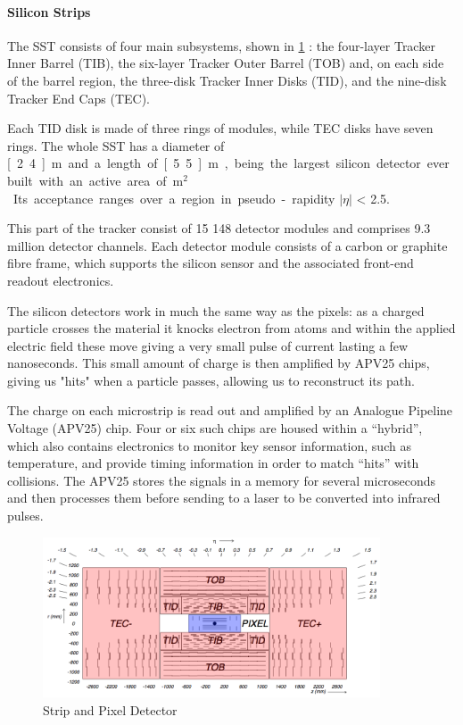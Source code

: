 \paragraph{Silicon Strips}

The SST consists of four main subsystems, shown in \cref{fig:strip}
: the four-layer Tracker Inner Barrel (TIB), the six-layer Tracker Outer Barrel (TOB) and, on each side of the barrel region, the three-disk Tracker Inner Disks (TID), and the nine-disk Tracker End Caps (TEC).

Each TID disk is made of three rings of modules, while TEC disks have seven rings. The whole SST has a diameter of \unit[2.4]{m} and a length of \unit[5.5]{m}, being the largest silicon detector ever built with an active area of \unit[198]{m$^{2}$}. Its acceptance ranges over a region in pseudo-rapidity $\left| \eta\right|$ < 2.5.

This part of the tracker consist of 15 148 detector
modules and comprises 9.3 million detector channels. Each detector module consists of a carbon or graphite fibre frame, which supports the silicon sensor and the associated front-end readout electronics.
 
The silicon detectors work in much the same way as the pixels: as a charged particle crosses the material it knocks electron from atoms and within the applied electric field these move giving a very small pulse of current lasting a few nanoseconds. This small amount of charge is then amplified by APV25 chips, giving us "hits" when a particle passes, allowing us to reconstruct its path.

The charge on each microstrip is read out and amplified by an Analogue Pipeline Voltage (APV25) chip. Four or six such chips are housed within a “hybrid”, which also contains electronics to monitor key sensor information, such as temperature, and provide timing information in order to match “hits” with collisions. The APV25 stores the signals in a memory for several microseconds and then processes them before sending to a laser to be converted into infrared pulses.


\begin{figure}[H]
  \centering
\includegraphics[width=10cm]{CMS_chapter_plots/strip}
  \caption{Strip and Pixel Detector \label{fig:strip}}
\end{figure}

